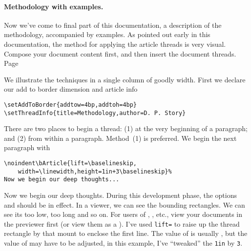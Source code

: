 \documentclass{article}
\begin{document}
\paragraph*{Methodology with examples.} Now we've come to final part of this
documentation, a description of the methodology, accompanied by examples. As
pointed out early in this documentation, the method for applying the article
threads is very visual. Compose your document content first, and then insert the
document threads. Page~
\begin{center}\previewtrue\viewMagWintrue
\begin{minipage}{.8\linewidth}\parindent=20pt\relax
We illustrate the techniques in a single column of goodly width.
First we declare our add to border dimension and article info
\begin{Verbatim}[fontsize=\small]
\setAddToBorder{addtow=4bp,addtoh=4bp}
\setThreadInfo{title=Methodology,author=D. P. Story}
\end{Verbatim}
There are two places to begin a thread: (1) at the very beginning of a paragraph;
and (2) from within a paragraph. Method~(1) is preferred. We begin the next paragraph
with
\begin{Verbatim}[fontsize=\small]
\noindent\bArticle{lift=\baselineskip,
    width=\linewidth,height=1in+3\baselineskip}%
Now we begin our deep thoughts...
\end{Verbatim}
\noindent{}%
Now we begin our deep thoughts. During this development phase, the options
 and  should be in effect. In a 
viewer, we can see the bounding rectangles. We can see its too low, too long
and so on. For users of , , etc., view your
documents in the  previewer first (or view them as a ).
I've used \texttt{lift=\string\baselineskip} to raise up the thread rectangle
by that mount to enclose the first line. The value of  is usually
, but the value of  may have to be adjusted, in this
example, I've ``tweaked'' the \texttt{1in} by \texttt{3\string\baselineskip}.


\end{minipage}
\end{center}
\end{document}
